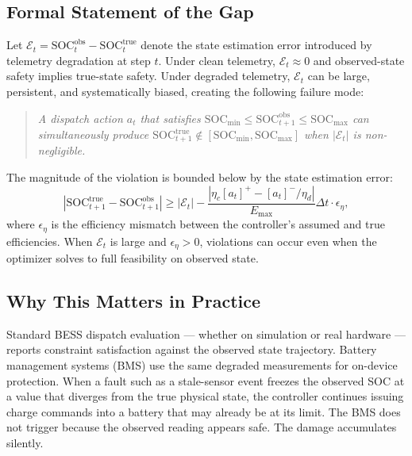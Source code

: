 \documentclass[11pt,a4paper]{article}
\begin{document}
\subsection{Formal Statement of the Gap}

Let $\mathcal{E}_t = \mathrm{SOC}_t^{\mathrm{obs}} - \mathrm{SOC}_t^{\mathrm{true}}$ denote the state estimation error introduced by telemetry degradation at step $t$. Under clean telemetry, $\mathcal{E}_t \approx 0$ and observed-state safety implies true-state safety. Under degraded telemetry, $\mathcal{E}_t$ can be large, persistent, and systematically biased, creating the following failure mode:

\begin{quote}
\textit{A dispatch action $a_t$ that satisfies $\mathrm{SOC}_{\min} \le \mathrm{SOC}_{t+1}^{\mathrm{obs}} \le \mathrm{SOC}_{\max}$ can simultaneously produce $\mathrm{SOC}_{t+1}^{\mathrm{true}} \notin [\mathrm{SOC}_{\min}, \mathrm{SOC}_{\max}]$ when $|\mathcal{E}_t|$ is non-negligible.}
\end{quote}

The magnitude of the violation is bounded below by the state estimation error:
\begin{equation}\label{eq:gap_lower_bound}
  |\mathrm{SOC}_{t+1}^{\mathrm{true}} - \mathrm{SOC}_{t+1}^{\mathrm{obs}}| \ge |\mathcal{E}_t| - \frac{|\eta_c [a_t]^+ - [a_t]^-/\eta_d|}{E_{\max}}\Delta t \cdot \epsilon_\eta,
\end{equation}
where $\epsilon_\eta$ is the efficiency mismatch between the controller's assumed and true efficiencies. When $\mathcal{E}_t$ is large and $\epsilon_\eta > 0$, violations can occur even when the optimizer solves to full feasibility on observed state.

\subsection{Why This Matters in Practice}

Standard BESS dispatch evaluation --- whether on simulation or real hardware --- reports constraint satisfaction against the observed state trajectory. Battery management systems (BMS) use the same degraded measurements for on-device protection. When a fault such as a stale-sensor event freezes the observed SOC at a value that diverges from the true physical state, the controller continues issuing charge commands into a battery that may already be at its limit. The BMS does not trigger because the observed reading appears safe. The damage accumulates silently.
\end{document}
